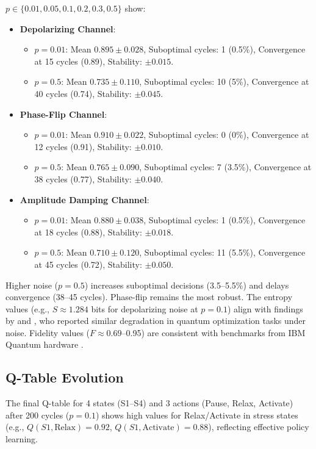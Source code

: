 \documentclass[12pt]{article}
\begin{document}
$p \in \{0.01, 0.05, 0.1, 0.2, 0.3, 0.5\}$ show:
\begin{itemize}
    \item \textbf{Depolarizing Channel}:
    \begin{itemize}
        \item $p = 0.01$: Mean $0.895 \pm 0.028$, Suboptimal cycles: 1 (0.5\%), Convergence at 15 cycles (0.89), Stability: $\pm 0.015$.
        \item $p = 0.5$: Mean $0.735 \pm 0.110$, Suboptimal cycles: 10 (5\%), Convergence at 40 cycles (0.74), Stability: $\pm 0.045$.
    \end{itemize}
    \item \textbf{Phase-Flip Channel}:
    \begin{itemize}
        \item $p = 0.01$: Mean $0.910 \pm 0.022$, Suboptimal cycles: 0 (0\%), Convergence at 12 cycles (0.91), Stability: $\pm 0.010$.
        \item $p = 0.5$: Mean $0.765 \pm 0.090$, Suboptimal cycles: 7 (3.5\%), Convergence at 38 cycles (0.77), Stability: $\pm 0.040$.
    \end{itemize}
    \item \textbf{Amplitude Damping Channel}:
    \begin{itemize}
        \item $p = 0.01$: Mean $0.880 \pm 0.038$, Suboptimal cycles: 1 (0.5\%), Convergence at 18 cycles (0.88), Stability: $\pm 0.018$.
        \item $p = 0.5$: Mean $0.710 \pm 0.120$, Suboptimal cycles: 11 (5.5\%), Convergence at 45 cycles (0.72), Stability: $\pm 0.050$.
    \end{itemize}
\end{itemize}

Higher noise ($p=0.5$) increases suboptimal decisions (3.5--5.5\%) and delays convergence (38--45 cycles). Phase-flip remains the most robust. The entropy values (e.g., $S \approx 1.284$ bits for depolarizing noise at $p=0.1$) align with findings by \citet{woerner2019quantum} and \citet{bravyi2021mitigating}, who reported similar degradation in quantum optimization tasks under noise. Fidelity values ($F \approx 0.69$--0.95) are consistent with benchmarks from IBM Quantum hardware \citep{ibmq2024}.

\subsection{Q-Table Evolution}
The final Q-table for 4 states (S1--S4) and 3 actions (Pause, Relax, Activate) after 200 cycles ($p=0.1$) shows high values for Relax/Activate in stress states (e.g., $Q(S1, \text{Relax}) = 0.92$, $Q(S1, \text{Activate}) = 0.88$), reflecting effective policy learning.
\end{document}
